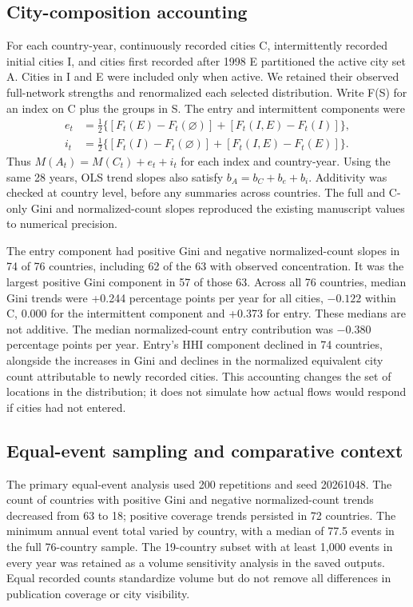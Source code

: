 \subsection{City-composition accounting}
\label{supp:city_entry}

For each country-year, continuously recorded cities C, intermittently recorded initial cities I, and cities first recorded after 1998 E partitioned the active city set A. Cities in I and E were included only when active. We retained their observed full-network strengths and renormalized each selected distribution. Write F(S) for an index on C plus the groups in S. The entry and intermittent components were
\begin{align*}
e_t&=\tfrac12\{[F_t(E)-F_t(\varnothing)]+[F_t(I,E)-F_t(I)]\},\\
i_t&=\tfrac12\{[F_t(I)-F_t(\varnothing)]+[F_t(I,E)-F_t(E)]\}.
\end{align*}
Thus $M(A_t)=M(C_t)+e_t+i_t$ for each index and country-year. Using the same 28 years, OLS trend slopes also satisfy $b_A=b_C+b_e+b_i$. Additivity was checked at country level, before any summaries across countries. The full and C-only Gini and normalized-count slopes reproduced the existing manuscript values to numerical precision.

The entry component had positive Gini and negative normalized-count slopes in 74 of 76 countries, including 62 of the 63 with observed concentration. It was the largest positive Gini component in 57 of those 63. Across all 76 countries, median Gini trends were +0.244 percentage points per year for all cities, $-0.122$ within C, 0.000 for the intermittent component and +0.373 for entry. These medians are not additive. The median normalized-count entry contribution was $-0.380$ percentage points per year. Entry's HHI component declined in 74 countries, alongside the increases in Gini and declines in the normalized equivalent city count attributable to newly recorded cities. This accounting changes the set of locations in the distribution; it does not simulate how actual flows would respond if cities had not entered.

\subsection{Equal-event sampling and comparative context}
\label{supp:rarefaction}

The primary equal-event analysis used 200 repetitions and seed 20261048. The count of countries with positive Gini and negative normalized-count trends decreased from 63 to 18; positive coverage trends persisted in 72 countries. The minimum annual event total varied by country, with a median of 77.5 events in the full 76-country sample. The 19-country subset with at least 1,000 events in every year was retained as a volume sensitivity analysis in the saved outputs. Equal recorded counts standardize volume but do not remove all differences in publication coverage or city visibility.

